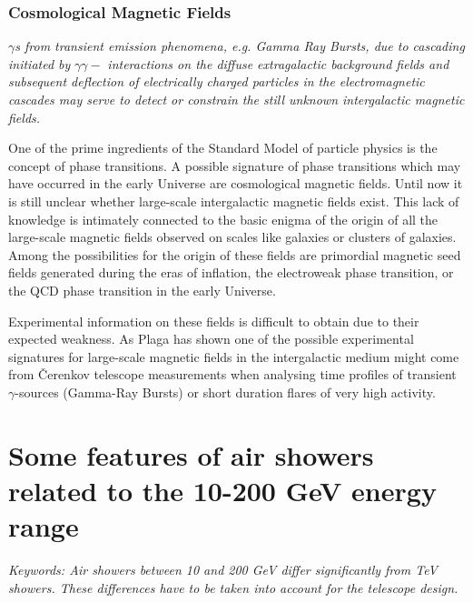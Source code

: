 \subsection{Cosmological Magnetic Fields}

$\gamma${\it s from transient emission
phenomena, e.g. Gamma Ray Bursts, due to cascading initiated by }$\gamma
\gamma -$ {\it interactions on the diffuse extragalactic background fields
and subsequent deflection of electrically charged particles in the
electromagnetic cascades may serve to detect or constrain the still unknown
intergalactic magnetic fields.}

\vspace{0.5cm}

One of the prime ingredients of the Standard Model of particle physics is the
concept of phase transitions. A possible signature of phase transitions
which may have occurred in the early Universe are cosmological magnetic
fields. Until now it is still unclear whether large-scale intergalactic
magnetic fields exist. This lack of knowledge is intimately connected to the
basic enigma of  the origin of all the large-scale magnetic fields observed
on scales like galaxies or clusters of galaxies. Among the possibilities for
the origin of these fields are primordial magnetic seed fields generated
during the eras of inflation, the electroweak phase transition, or the QCD
phase transition in the early Universe.

Experimental information on these fields is difficult to obtain due to their
expected weakness. As Plaga has shown \cite{plaga:95} one of the possible
experimental signatures for large-scale magnetic fields in the intergalactic
medium might come from \v{C}erenkov telescope measurements when analysing
time profiles of transient $\gamma$-sources (Gamma-Ray Bursts) or short
duration flares of very high activity.

\newpage
\begin{figure}[t]
\leavevmode
\begin{center}
\epsfxsize=15cm
\end{center}
\end{figure}
\newpage
\setcounter{chapter}{2}
\chapter{Some features of air showers related to the 10-200 GeV 
energy range}
\par\medskip
{\it Keywords: Air showers between 10 and 200 GeV differ significantly 
from TeV showers. These 
differences have to be taken into account for the telescope design.}

